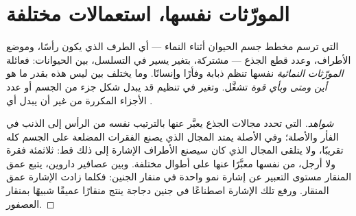 \section{المورّثات نفسها، استعمالات مختلفة}

\begin{proposition}\label{prop:g12:diversification-of-life:development}
 التي ترسم مخطط جسم الحيوان أثناء النماء --- أي الطرف الذي
يكون رأسًا، وموضع الأطراف، وعدد قطع الجذع --- مشتركة، بتغير يسير في
التسلسل، بين الحيوانات: فعائلة \emph{المورّثات
النمائية} نفسها تنظم ذبابة وفأرًا وإنسانًا. وما
يختلف بين  ليس هذه  بقدر ما هو \emph{أين ومتى وبأي
قوة} تشغَّل. وتغير في تنظيم  قد يبدل شكل جزء من الجسم أو
عدد الأجزاء المكررة من غير أن يبدل أي .
\end{proposition}
\begin{proof}[شواهد]
 التي تحدد مجالات الجذع يعبَّر عنها بالترتيب نفسه من الرأس
إلى الذنب في الفأر والأصلة؛ وفي الأصلة يمتد المجال الذي يصنع الفقرات
المضلعة على الجسم كله تقريبًا، ولا يتلقى المجال الذي كان سيصنع
الأطراف الإشارة إلى ذلك قط: ثلاثمئة فقرة ولا أرجل، من  نفسها
معبَّرًا عنها على أطوال مختلفة. وبين عصافير داروين، يتبع عمق المنقار
مستوى التعبير عن إشارة نمو واحدة في منقار الجنين: فكلما زادت الإشارة
عمق المنقار. ورفع تلك الإشارة اصطناعًا في جنين دجاجة ينتج منقارًا
عميقًا شبيهًا بمنقار العصفور.
\end{proof}

